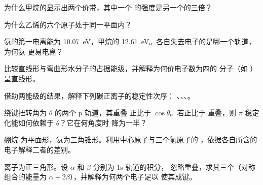 \begin{exercise}[$\star$]\label{exo:b2:fragment-orbitals:3}
为什么甲烷的显示出两个价带，其中一个
的强度是另一个的三倍？
\end{exercise}

\begin{exercise}[$\star$]\label{exo:b2:fragment-orbitals:4}
为什么乙烯的六个原子处于同一平面内？
\end{exercise}

\begin{exercise}[$\star\star$]\label{exo:b2:fragment-orbitals:5}
氨的第一电离能为 \qty{10.07}{eV}，甲烷的
\qty{12.61}{eV}。各自失去电子的是哪一个轨道，为何氨
更易电离？
\end{exercise}

\begin{exercise}[$\star\star$]\label{exo:b2:fragment-orbitals:6}
比较直线形与弯曲形水分子的占据能级，并解释为何价电子数为四的
分子（如 ）呈直线形。
\end{exercise}

\begin{exercise}[$\star\star$]\label{exo:b2:fragment-orbitals:7}
借助两能级的结果，解释下列碳正离子的稳定性次序：
、、、。
\end{exercise}

\begin{exercise}[$\star\star$]\label{exo:b2:fragment-orbitals:8}
绕键扭转角为 $\theta$ 的两个 p 轨道，其重叠
正比于 $\cos\theta$。若正比于
重叠，则 $\pi$ 稳定化能如何依赖于 $\theta$？它在何角度时
降为一半？
\end{exercise}

\begin{exercise}[$\star\star$]\label{exo:b2:fragment-orbitals:9}
硼烷  为平面形，氨为三角锥形。利用中心原子与三个氢原子的
，依据各自所含的电子解释二者的差别。
\end{exercise}

\begin{exercise}[$\star\star\star$]\label{exo:b2:fragment-orbitals:10}
 离子为正三角形。设 $\alpha$ 和 $\beta$ 分别为 1s 轨道的积分，
忽略重叠，求其三个（对称组合的能量为
$\alpha + 2\beta$），并解释为何两个电子足以
使其成键。
\end{exercise}

